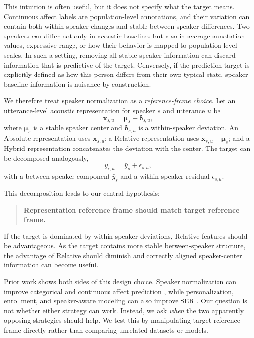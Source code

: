 \documentclass[11pt]{article}
\begin{document}
This intuition is often useful, but it does not specify what the target means.
Continuous affect labels are population-level annotations, and their variation can contain both within-speaker changes and stable between-speaker differences.
Two speakers can differ not only in acoustic baselines but also in average annotation values, expressive range, or how their behavior is mapped to population-level scales.
In such a setting, removing all stable speaker information can discard information that is predictive of the target.
Conversely, if the prediction target is explicitly defined as how this person differs from their own typical state, speaker baseline information is nuisance by construction.

We therefore treat speaker normalization as a \emph{reference-frame choice}.
Let an utterance-level acoustic representation for speaker $s$ and utterance $u$ be
\begin{equation}
    \mathbf{x}_{s,u} = \boldsymbol{\mu}_s + \boldsymbol{\delta}_{s,u},
\end{equation}
where $\boldsymbol{\mu}_s$ is a stable speaker center and $\boldsymbol{\delta}_{s,u}$ is a within-speaker deviation.
An Absolute representation uses $\mathbf{x}_{s,u}$; a Relative representation uses $\mathbf{x}_{s,u}-\boldsymbol{\mu}_s$; and a Hybrid representation concatenates the deviation with the center.
The target can be decomposed analogously,
\begin{equation}
    y_{s,u} = \bar{y}_s + \epsilon_{s,u},
\end{equation}
with a between-speaker component $\bar{y}_s$ and a within-speaker residual $\epsilon_{s,u}$.

This decomposition leads to our central hypothesis:
\begin{quote}
\textbf{Representation reference frame should match target reference frame.}
\end{quote}
If the target is dominated by within-speaker deviations, Relative features should be advantageous.
As the target contains more stable between-speaker structure, the advantage of Relative should diminish and correctly aligned speaker-center information can become useful.

Prior work shows both sides of this design choice.
Speaker normalization can improve categorical and continuous affect prediction \citep{busso2013normalization,dang2016factor,gat2022speaker}, while personalization, enrollment, and speaker-aware modeling can also improve SER \citep{triantafyllopoulos2024enrolment,shi2025speaker}.
Our question is not whether either strategy can work.
Instead, we ask \emph{when} the two apparently opposing strategies should help.
We test this by manipulating target reference frame directly rather than comparing unrelated datasets or models.
\end{document}
